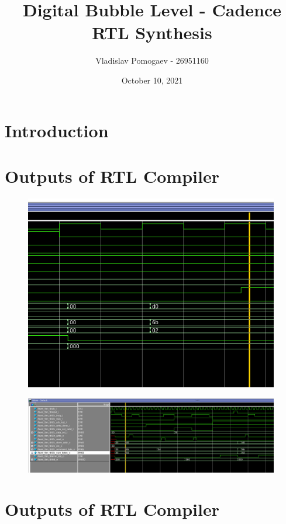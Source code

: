 \documentclass[11pt]{article}
\title{Digital Bubble Level - Cadence RTL Synthesis}
\author{Vladislav Pomogaev - 26951160}
\date{October 10, 2021}
\begin{document}
\maketitle

\section{Introduction}

\section{Outputs of RTL Compiler}

\begin{figure}[H]
    \centering
\includegraphics[width=0.99\textwidth]{closeup_delayed_wave.png}
    \caption{}
\end{figure}
\begin{figure}[H]
    \centering
\includegraphics[width=0.99\textwidth]{delayed_wave.png}
    \caption{}
\end{figure}

\section{Outputs of RTL Compiler}
\end{document}
